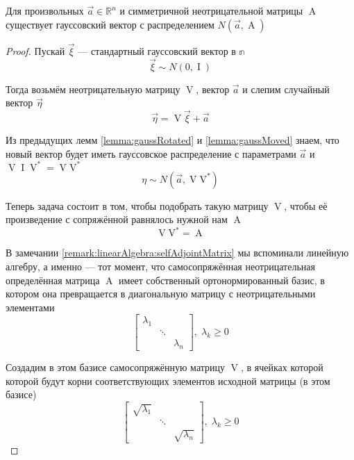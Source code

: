 \begin{theorem}\label{theorem:gaussianVectorExistance}
    Для произвольных $\vec{a} \in \mathbb{R}^n$ и симметричной неотрицательной
    матрицы $\operatorname{A}$ существует гауссовский вектор с распределением
    $N\left( \vec{a}, \operatorname{A} \right)$
\end{theorem}
\begin{proof}
    Пускай $\vec{\xi}$ --- стандартный гауссовский вектор в $\mathbb{n}$
    $$\vec{\xi} \sim N\left( 0, \operatorname{I} \right)$$

    Тогда возьмём неотрицательную матрицу $\operatorname{V}$, вектор $\vec{a}$ и
    слепим случайный вектор $\vec{\eta}$
    $$\vec{\eta} = \operatorname{V} \vec{\xi} + \vec{a}$$

    Из предыдущих лемм \ref{lemma:gaussRotated} и \ref{lemma:gaussMoved}
    знаем, что новый вектор будет иметь гауссовское распределение с параметрами
    $\vec{a}$ и $\operatorname{V} \operatorname{I} \operatorname{V}^* 
    = \operatorname{V} \operatorname{V^*} $
    $$\eta \sim N\left( \vec{a}, \operatorname{V} \operatorname{V^*} \right)$$

    Теперь задача состоит в том, чтобы подобрать такую матрицу $\operatorname{V}$,
    чтобы её произведение с сопряжённой равнялось нужной нам $\operatorname{A}$
    $$\operatorname{V} \operatorname{V^*} = \operatorname{A}$$

    В замечании \ref{remark:linearAlgebra:selfAdjointMatrix} мы вспоминали
    линейную алгебру, а именно --- тот момент, что самосопряжённая
    неотрицательная определённая матрица $\operatorname{A}$ имеет собственный
    ортонормированный базис, в котором она превращается в диагональную матрицу
    с неотрицательными элементами
    $$
    \begin{bmatrix}
        \lambda_1 & & \\
        & \ddots &  \\
        & & \lambda_n
    \end{bmatrix},\;
        \lambda_k \ge 0$$

    Создадим в этом базисе самосопряжённую матрицу $\operatorname{V}$, в ячейках
    которой которой будут корни соответствующих элементов исходной матрицы
    (в этом базисе)
    $$
    \begin{bmatrix}
        \sqrt{\lambda_1} & & \\
        & \ddots &  \\
        & & \sqrt{\lambda_n}
    \end{bmatrix},\; \lambda_k \ge 0$$


\end{proof}
